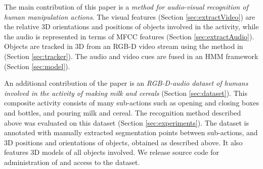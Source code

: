 \documentclass[letterpaper, 10pt, conference]{ieeeconf}
\begin{document}
The main contribution of this paper is a {\em method for audio-visual recognition of human manipulation actions}. The visual features (Section \ref{sec:extractVideo}) are the relative 3D orientations and positions of objects involved in the activity, while the audio is represented in terms of MFCC features \cite{Hasan04} (Section \ref{sec:extractAudio}). Objects are tracked in 3D from an RGB-D video stream using the method in \cite{KarlTracker} (Section \ref{sec:tracker}). The audio and video cues are fused in an HMM framework (Section \ref{sec:model}). 

An additional contribution of the paper is an {\em RGB-D-audio dataset of humans involved in the activity of making milk and cereals} (Section \ref{sec:dataset}).  This composite activity consists of many sub-actions such as opening and closing boxes and bottles, and pouring milk and cereal. The recognition method described above was evaluated on this dataset (Section \ref{sec:experiments}). The dataset is annotated with manually extracted segmentation points between sub-actions, and 3D positions and orientations of objects, obtained as described above. It also features 3D models of all objects involved. We release source code for administration of and access to the dataset.


%

%







\end{document}
